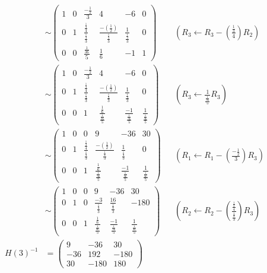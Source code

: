 \documentclass[11pt]{article}
\begin{document}
\[\begin{aligned}
&\sim \begin{pmatrix}1 & 0 & \frac{-\frac{1}{2}}{3} & 4 & -6 & 0 \\ 0 & 1 & \frac{\frac{\frac{1}{3}}{4}}{\frac{\frac{1}{4}}{3}} & \frac{-\left(\frac{1}{2}\right)}{\frac{\frac{1}{4}}{3}} & \frac{1}{\frac{\frac{1}{4}}{3}} & 0 \\ 0 & 0 & \frac{\frac{1}{36}}{5} & \frac{1}{6} & -1 & 1\end{pmatrix} && \left(R_{3}\leftarrow R_{3}-\left(\frac{\frac{1}{3}}{4}\right)R_{2}\right) \\
&\sim \begin{pmatrix}1 & 0 & \frac{-\frac{1}{2}}{3} & 4 & -6 & 0 \\ 0 & 1 & \frac{\frac{\frac{1}{3}}{4}}{\frac{\frac{1}{4}}{3}} & \frac{-\left(\frac{1}{2}\right)}{\frac{\frac{1}{4}}{3}} & \frac{1}{\frac{\frac{1}{4}}{3}} & 0 \\ 0 & 0 & 1 & \frac{\frac{1}{6}}{\frac{\frac{1}{36}}{5}} & \frac{-1}{\frac{\frac{1}{36}}{5}} & \frac{1}{\frac{\frac{1}{36}}{5}}\end{pmatrix} && \left(R_{3}\leftarrow \frac{1}{\frac{\frac{1}{36}}{5}}R_{3}\right) \\
&\sim \begin{pmatrix}1 & 0 & 0 & 9 & -36 & 30 \\ 0 & 1 & \frac{\frac{\frac{1}{3}}{4}}{\frac{\frac{1}{4}}{3}} & \frac{-\left(\frac{1}{2}\right)}{\frac{\frac{1}{4}}{3}} & \frac{1}{\frac{\frac{1}{4}}{3}} & 0 \\ 0 & 0 & 1 & \frac{\frac{1}{6}}{\frac{\frac{1}{36}}{5}} & \frac{-1}{\frac{\frac{1}{36}}{5}} & \frac{1}{\frac{\frac{1}{36}}{5}}\end{pmatrix} && \left(R_{1}\leftarrow R_{1}-\left(\frac{-\frac{1}{2}}{3}\right)R_{3}\right) \\
&\sim \begin{pmatrix}1 & 0 & 0 & 9 & -36 & 30 \\ 0 & 1 & 0 & \frac{-3}{\frac{\frac{1}{4}}{3}} & \frac{16}{\frac{\frac{1}{4}}{3}} & -180 \\ 0 & 0 & 1 & \frac{\frac{1}{6}}{\frac{\frac{1}{36}}{5}} & \frac{-1}{\frac{\frac{1}{36}}{5}} & \frac{1}{\frac{\frac{1}{36}}{5}}\end{pmatrix} && \left(R_{2}\leftarrow R_{2}-\left(\frac{\frac{\frac{1}{3}}{4}}{\frac{\frac{1}{4}}{3}}\right)R_{3}\right) \\
H\left(3\right)^{-1} &= \begin{pmatrix}9 & -36 & 30 \\ -36 & 192 & -180 \\ 30 & -180 & 180\end{pmatrix}\end{aligned}\]
\end{document}
